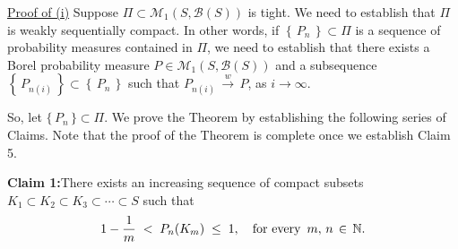 \vskip 0.3cm
\noindent
\underline{Proof of (i)}
\vskip 0.2cm
\noindent
Suppose $\Pi \subset \mathcal{M}_{1}(S,\mathcal{B}(S))$ is tight.
We need to establish that $\Pi$ is weakly sequentially compact.
In other words, if $\left\{\,P_{n}\,\right\} \subset \Pi$ is a sequence of probability measures contained in $\Pi$,
we need to establish that there exists a Borel probability measure
$P \in \mathcal{M}_{1}(S,\mathcal{B}(S))$ and a subsequence
$\left\{\,P_{n(i)}\,\right\} \subset \left\{\,P_{n}\,\right\}$
such that $P_{n(i)}\,\overset{w}{\longrightarrow}\,P$, as $i \longrightarrow \infty$.

\vskip 0.5cm
\noindent
So, let $\{\,P_{n}\,\} \subset \Pi$.
We prove the Theorem by establishing the following series of Claims.
Note that the proof of the Theorem is complete once we establish Claim 5.

\vskip 0.5cm
\begin{center}
\begin{minipage}{6.5in}
\textbf{Claim 1:}\quad There exists an increasing sequence of compact subsets
$K_{1} \subset K_{2} \subset K_{3} \subset \cdots \subset S$ such that
\begin{equation*}
1 - \dfrac{1}{m} \; < \; P_{n}(K_{m}) \; \leq \; 1,
\quad
\textnormal{for every \,$m, \,n \,\in\, \mathbb{N}$}.
\end{equation*}
\end{minipage}
\end{center}


